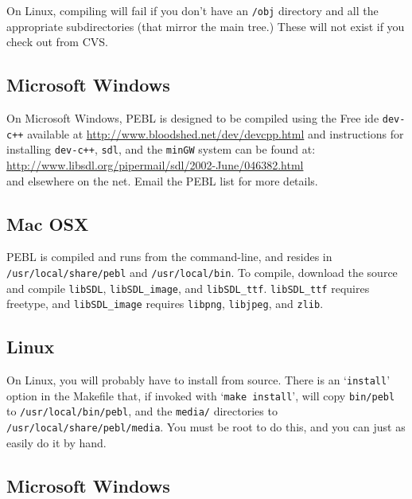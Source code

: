 On Linux, compiling will fail if you don't have an \texttt{/obj}
directory and all the appropriate subdirectories (that mirror the main
tree.)  These will not exist if you check out from CVS.

\subsection{Microsoft Windows}

On Microsoft Windows, PEBL is designed to be compiled using the Free
ide \texttt{dev-c++} available at
\href{http://www.bloodshed.net/dev/devcpp.html}{http://www.bloodshed.net/dev/devcpp.html}
and instructions for installing \texttt{dev-c++}, \texttt{sdl}, and
the \texttt{minGW} system can be found at:\\

\href{http://www.libsdl.org/pipermail/sdl/2002-June/046382.html}{http://www.libsdl.org/pipermail/sdl/2002-June/046382.html}\\

and elsewhere on the net.  Email the PEBL list for more details.

\subsection{Mac OSX}

PEBL is compiled
and runs from the command-line, and resides in
\texttt{/usr/local/share/pebl} and \texttt{/usr/local/bin}.  To
compile, download the source and compile \texttt{libSDL},
\texttt{libSDL\_image}, and \texttt{libSDL\_ttf}.
\texttt{libSDL\_ttf} requires freetype, and \texttt{libSDL\_image}
requires \texttt{libpng}, \texttt{libjpeg}, and \texttt{zlib}.



\subsection{Linux}

On Linux, you will probably have to install from source.
There is an `\texttt{install}' option in the Makefile that, if invoked with
`\texttt{make install}', will copy \texttt{bin/pebl} to \texttt{/usr/local/bin/pebl}, and the
\texttt{media/} directories to \texttt{/usr/local/share/pebl/media}.  You must be root
to do this, and you can just as easily do it by hand.

\subsection{Microsoft Windows}

